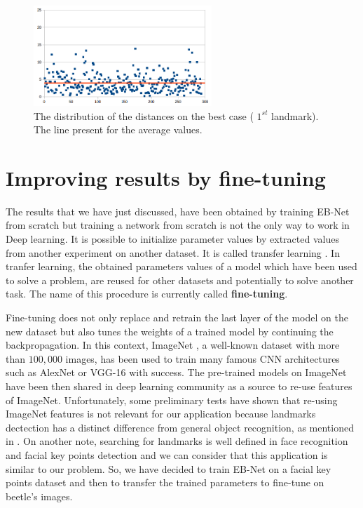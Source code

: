 \documentclass[review]{elsarticle}
\begin{document}
\begin{figure}[htbp]
    \centering
    \includegraphics[width=0.6\textwidth]{images/charts/fs_lm1.png}
    \caption{The distribution of the distances on the best case ( $1^{st}$ landmark).\\ The line present for the average values.}
    \label{figchartlm1}
\end{figure}

\section{Improving results by fine-tuning}
\label{sfineTuning}
The results that we have just discussed, have been obtained by training EB-Net from scratch but training a network from scratch is not the only way to work in Deep learning. It is possible to initialize parameter values by extracted values from another experiment on another dataset. It is called transfer learning \cite{torrey2009transfer}. In tranfer learning, the obtained parameters values of a model which have been used to solve a problem, are reused for other datasets \cite{margeta_mri} and potentially to solve another task. The name of this procedure is currently called \textbf{fine-tuning}.

Fine-tuning does not only replace and retrain the last layer of the model on
the new dataset but also tunes the weights of a trained
model by continuing the backpropagation. In this context, ImageNet \cite{imagenet_cvpr09}, a well-known dataset with more than $100,000 $ images, has been used to train many famous CNN architectures such as AlexNet \cite{krizhevsky2012imagenet} or VGG-16 \cite{simonyan2014very} with success. The pre-trained models on ImageNet have been then shared in deep learning community as a source to re-use features of ImageNet. Unfortunately, some preliminary tests have shown that re-using ImageNet features
is not relevant for our application because landmarks dectection has a distinct difference from general object recognition, as mentioned in \cite{lin2016homemade}. On another note, searching for landmarks is well defined in face recognition and facial key points detection and we can consider that this application is similar to our problem. So, we have decided to train EB-Net on a facial key points dataset and then to transfer the trained parameters to fine-tune on beetle's images.
\end{document}
